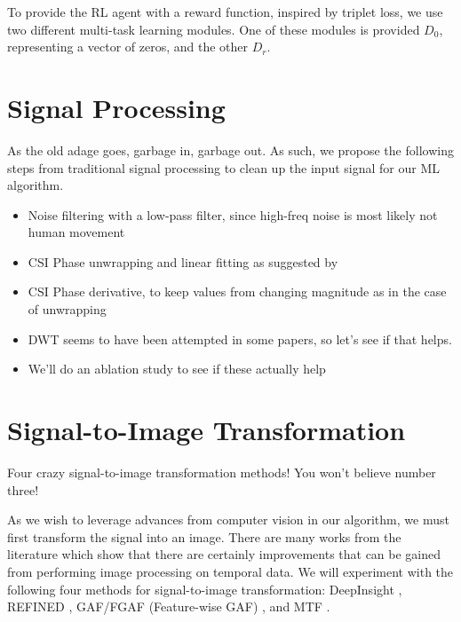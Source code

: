 To provide the RL agent with a reward function, inspired by triplet loss, we use two different multi-task learning modules.
One of these modules is provided $D_{0}$, representing a vector of zeros, and the other $D_{r}$.


\section{Signal Processing}\label{sec:methodology-signal-preprocessing}

As the old adage goes, garbage in, garbage out.
As such, we propose the following steps from traditional signal processing to clean up the input signal for our ML algorithm.

\begin{itemize}
	\item Noise filtering with a low-pass filter, since high-freq noise is most likely not human movement
	\item CSI Phase unwrapping and linear fitting as suggested by \cite{geng2022densepose}
	\item CSI Phase derivative, to keep values from changing magnitude as in the case of unwrapping
	\item DWT seems to have been attempted in some papers, so let's see if that helps.
	\item We'll do an ablation study to see if these actually help
\end{itemize}

\section{Signal-to-Image Transformation}\label{sec:methodology-signal-to-image}

Four crazy signal-to-image transformation methods! You won't believe number three!

As we wish to leverage advances from computer vision in our algorithm, we must first transform the signal into an image.
There are many works from the literature which show that there are certainly improvements that can be gained from performing image processing on temporal data.
We will experiment with the following four methods for signal-to-image transformation: DeepInsight \cite{sharma2019deepinsight}, REFINED \cite{bazgir2020representation}, GAF/FGAF (Feature-wise GAF) \cite{wang2015imaging,satyawan2023cnns}, and MTF \cite{wang2015imaging}.

